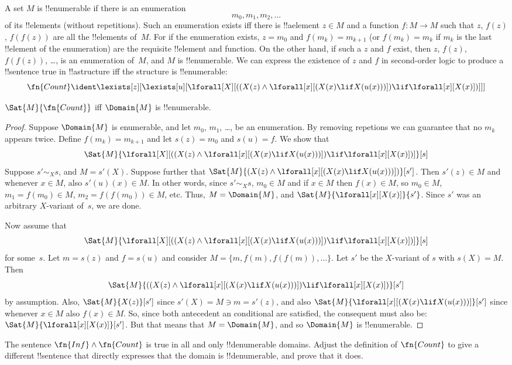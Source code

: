\documentclass[../../../include/open-logic-section]{subfiles}
\begin{document}
A set $M$ is !!{enumerable} if there is an enumeration
\[
m_0, m_1, m_2, \dots
\]
of its !!{element}s (without repetitions).  Such an enumeration exists
iff there is !!a{element} $z \in M$ and a function $f\colon M \to M$
such that $z$, $f(z)$, $f(f(z))$ are all the !!{element}s of~$M$. For
if the enumeration exists, $z = m_0$ and $f(m_k) = m_{k+1}$ (or
$f(m_k) = m_k$ if $m_k$ is the last !!{element} of the enumeration)
are the requisite !!{element} and function. On the other hand, if such
a $z$ and $f$ exist, then $z$, $f(z)$, $f(f(z))$, \dots, is an
enumeration of~$M$, and $M$ is !!{enumerable}.  We can express the
existence of $z$ and $f$ in second-order logic to produce a
!!{sentence} true in !!a{structure} iff the structure is
!!{enumerable}:
\[
\fn{Count} \ident
\lexists[z][\lexists[u][\lforall[X][((X(z) \land
      \lforall[x][(X(x) \lif X(u(x)))]) \lif \lforall[x][X(x)])]]]
\]

\begin{prop}
$\Sat{M}{\fn{Count}}$ iff $\Domain{M}$ is !!{enumerable}.
\end{prop}

\begin{proof}
Suppose $\Domain{M}$ is enumerable, and let $m_0$, $m_1$, \dots, be an
enumeration. By removing repetions we can guarantee that no $m_k$
appears twice. Define $f(m_k) = m_{k+1}$ and let $s(z) = m_0$ and
$s(u) = f$. We show that
\[
\Sat{M}{\lforall[X][((X(z) \land \lforall[x][(X(x) \lif X(u(x)))])
    \lif \lforall[x][X(x)])]}[s]
\]
Suppose $s' \sim_X s$, and $M = s'(X)$. Suppose further that
$\Sat{M}{(X(z) \land \lforall[x][(X(x) \lif X(u(x)))])}[s']$. Then
$s'(z) \in M$ and whenever $x \in M$, also $s'(u)(x) \in M$. In other
words, since $s' \sim_X s$, $m_0 \in M$ and if $x \in M$ then $f(x)
\in M$, so $m_0 \in M$, $m_1 = f(m_0) \in M$, $m_2 = f(f(m_0)) \in M$,
etc. Thus, $M = \Domain{M}$, and
$\Sat{M}{\lforall[x][X(x)]}{s'}$. Since $s'$ was an arbitrary
$X$-variant of~$s$, we are done.

Now assume that
\[
\Sat{M}{\lforall[X][((X(z) \land \lforall[x][(X(x) \lif X(u(x)))])
    \lif \lforall[x][X(x)])]}[s]
\]
for some~$s$. Let $m = s(z)$ and $f = s(u)$ and consider $M = \{m,
f(m), f(f(m)), \dots\}$. Let $s'$ be the $X$-variant of $s$ with $s(X)
= M$. Then
\[
\Sat{M}{((X(z) \land \lforall[x][(X(x) \lif X(u(x)))])
    \lif \lforall[x][X(x)])}[s']
\]
by assumption. Also, $\Sat{M}{X(z)}[s']$ since $s'(X) = M \ni m =
s'(z)$, and also $\Sat{M}{\lforall[x][(X(x) \lif X(u(x)))]}[s']$ since
whenever $x \in M$ also $f(x) \in M$. So, since both antecedent an
conditional are satisfied, the consequent must also be:
$\Sat{M}{\lforall[x][X(x)]}[s']$. But that means that $M =
\Domain{M}$, and so $\Domain{M}$ is !!{enumerable}.
\end{proof}

\begin{prob}
The sentence $\fn{Inf} \land \fn{Count}$ is true in all and only
!!{denumerable} domains.  Adjust the definition of $\fn{Count}$ to
give a different !!{sentence} that directly expresses that the domain
is !!{denumerable}, and prove that it does.
\end{prob}
\end{document}
